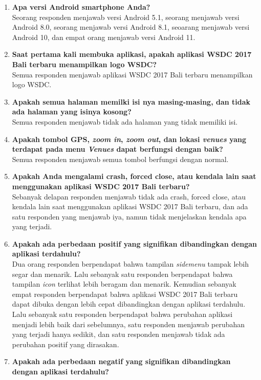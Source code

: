 \begin{enumerate}
	\item \textbf{Apa versi Android smartphone Anda?} \\
	Seorang responden menjawab versi Android 5.1, seorang menjawab versi Android 8.0, seorang menjawab versi Android 8.1, seoarang menjawab versi Android 10, dan empat orang menjawab versi Android 11.
	\item \textbf{Saat pertama kali membuka aplikasi, apakah aplikasi WSDC 2017 Bali terbaru menampilkan logo WSDC?} \\
	Semua responden menjawab aplikasi WSDC 2017 Bali terbaru menampilkan logo WSDC.
	\item \textbf{Apakah semua halaman memilki isi nya masing-masing, dan tidak ada halaman yang isinya kosong?} \\
	Semua responden menjawab tidak ada halaman yang tidak memiliki isi.
	\item \textbf{Apakah tombol GPS, \textit{zoom in}, \textit{zoom out}, dan lokasi \textit{venues} yang terdapat pada menu \textit{Venues} dapat berfungsi dengan baik?} \\
	Semua responden menjawab semua tombol berfungsi dengan normal.
	\newpage
	\item \textbf{Apakah Anda mengalami crash, forced close, atau kendala lain saat menggunakan aplikasi WSDC 2017 Bali terbaru?} \\
	Sebanyak delapan responden menjawab tidak ada crash, forced close, atau kendala lain saat menggunakan aplikasi WSDC 2017 Bali terbaru, dan ada satu responden yang menjawab iya, namun tidak menjelaskan kendala apa yang terjadi.
	\item \textbf{Apakah ada perbedaan positif yang signifikan dibandingkan dengan aplikasi terdahulu?} \\
	Dua orang responden berpendapat bahwa tampilan \textit{sidemenu} tampak lebih segar dan menarik. Lalu sebanyak satu responden berpendapat bahwa tampilan \textit{icon} terlihat lebih beragam dan menarik. Kemudian sebanyak empat responden berpendapat bahwa aplikasi WSDC 2017 Bali terbaru dapat dibuka dengan lebih cepat dibandingkan dengan aplikasi terdahulu. Lalu sebanyak satu responden berpendapat bahwa perubahan aplikasi menjadi lebih baik dari sebelumnya, satu responden menjawab perubahan yang terjadi hanya sedikit, dan satu responden menjawab tidak ada perubahan positif yang dirasakan.
	\item \textbf{Apakah ada perbedaan negatif yang signifikan dibandingkan dengan aplikasi terdahulu?} \\

\end{enumerate}
